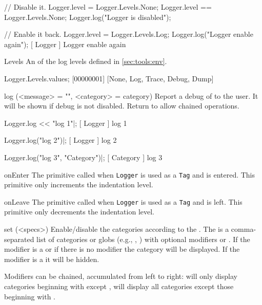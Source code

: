 \begin{urbiscriptapi}
\begin{urbiassert}
// Disable it.
Logger.level = Logger.Levels.None;
Logger.level == Logger.Levels.None;
Logger.log("Logger is disabled");

// Enable it back.
Logger.level = Logger.Levels.Log;
Logger.log("Logger enable again");
[        Logger         ] Logger enable again
\end{urbiassert}

\item[Levels]%
  An  of the log levels defined in
  \autoref{sec:tools:env}.

\begin{urbiscript}
Logger.Levels.values;
[00000001] [None, Log, Trace, Debug, Dump]
\end{urbiscript}

\item[log](<message> = "", <category> = category)%
  Report a debug  of  to the user. It will be
  shown if debug is not disabled. Return \this to allow chained operations.
\begin{urbiscript}
Logger.log << "log 1"|;
[       Logger        ] log 1

Logger.log("log 2")|;
[       Logger        ] log 2

Logger.log("log 3", "Category")|;
[      Category       ] log 3
\end{urbiscript}

\item[onEnter]%
  The primitive called when \lstinline|Logger| is used as a \lstinline|Tag|
  and is entered. This primitive only increments the indentation level.

\item[onLeave]%
  The primitive called when \lstinline|Logger| is used as a \lstinline|Tag|
  and is left. This primitive only decrements the indentation level.

\item[set](<specs>)%
  Enable/disable the categories according to the .  The
   is a comma-separated list of categories or globs (e.g.,
  , ) with optional modifiers \samp{+} or
  \samp{-}.  If the modifier is a \samp{+} or if there is no modifier the
  category will be displayed.  If the modifier is a \samp{-} it will be
  hidden.

  Modifiers can be chained, accumulated from left to right:
   will only display categories beginning with
   except ,  will display all
  categories except those beginning with .


\end{urbiscriptapi}
